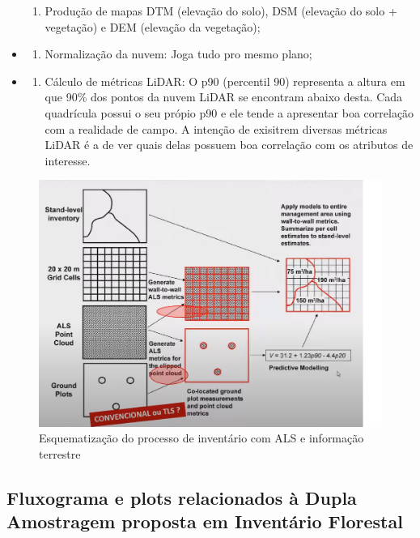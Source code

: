 \documentclass[
]{article}
\providecommand{\tightlist}{%
  \setlength{\itemsep}{0pt}\setlength{\parskip}{0pt}}
\begin{document}
\begin{itemize}
\begin{enumerate}
  \tightlist
  \item
    Produção de mapas DTM (elevação do solo), DSM (elevação do solo +
    vegetação) e DEM (elevação da vegetação);
  \end{enumerate}
\item
  \begin{enumerate}
  \def\labelenumi{\arabic{enumi}.}
  \setcounter{enumi}{7}
  \tightlist
  \item
    Normalização da nuvem: Joga tudo pro mesmo plano;
  \end{enumerate}
\item
  \begin{enumerate}
  \def\labelenumi{\arabic{enumi}.}
  \setcounter{enumi}{8}
  \tightlist
  \item
    Cálculo de métricas LiDAR: O p90 (percentil 90) representa a altura
    em que 90\% dos pontos da nuvem LiDAR se encontram abaixo desta.
    Cada quadrícula possui o seu própio p90 e ele tende a apresentar boa
    correlação com a realidade de campo. A intenção de exisitrem
    diversas métricas LiDAR é a de ver quais delas possuem boa
    correlação com os atributos de interesse.
  \end{enumerate}
\end{itemize}

\begin{figure}

{\centering \includegraphics[width=0.4\linewidth]{IMAGES/als-e-info-campo} 

}

\caption{Esquematização do processo de inventário com ALS e informação terrestre}\label{fig:unnamed-chunk-7}
\end{figure}

\newpage

\subsection{Fluxograma e plots relacionados à Dupla Amostragem proposta
em Inventário
Florestal}\label{fluxograma-e-plots-relacionados-uxe0-dupla-amostragem-proposta-em-inventuxe1rio-florestal}
\end{document}
